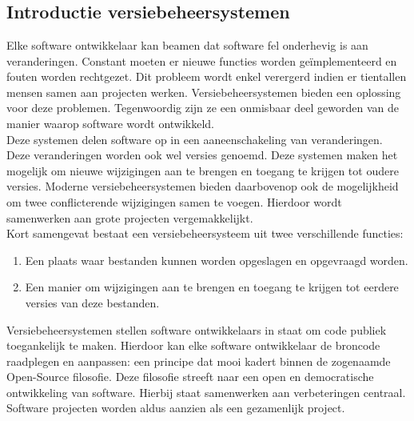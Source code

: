 
\chapter{}
\label{ch:inleiding}
\section{Introductie versiebeheersystemen}
Elke software ontwikkelaar kan beamen dat software fel onderhevig is aan veranderingen. Constant moeten er nieuwe functies worden geïmplementeerd en fouten worden rechtgezet. Dit probleem wordt enkel verergerd indien er tientallen mensen samen aan projecten werken. Versiebeheersystemen bieden een oplossing voor deze problemen. Tegenwoordig zijn ze een onmisbaar deel geworden van de manier waarop software wordt ontwikkeld.\\

Deze systemen delen software op in een aaneenschakeling van veranderingen. Deze veranderingen worden ook wel versies genoemd. Deze systemen maken het mogelijk om nieuwe wijzigingen aan te brengen en toegang te krijgen tot oudere versies. Moderne versiebeheersystemen bieden daarbovenop ook de mogelijkheid om twee conflicterende wijzigingen samen te voegen. Hierdoor wordt samenwerken aan grote projecten vergemakkelijkt.\\

Kort samengevat bestaat een versiebeheersysteem uit twee verschillende functies:

\begin{enumerate}
\item Een plaats waar bestanden kunnen worden opgeslagen en opgevraagd worden.
\item Een manier om wijzigingen aan te brengen en toegang te krijgen tot eerdere versies van deze bestanden.
\end{enumerate}

Versiebeheersystemen stellen software ontwikkelaars in staat om code publiek toegankelijk te maken. Hierdoor kan elke software ontwikkelaar de broncode raadplegen en aanpassen: een principe dat mooi kadert binnen de zogenaamde Open-Source filosofie. Deze filosofie streeft naar een open en democratische ontwikkeling van software. Hierbij staat samenwerken aan verbeteringen centraal. Software projecten worden aldus aanzien als een gezamenlijk project.

